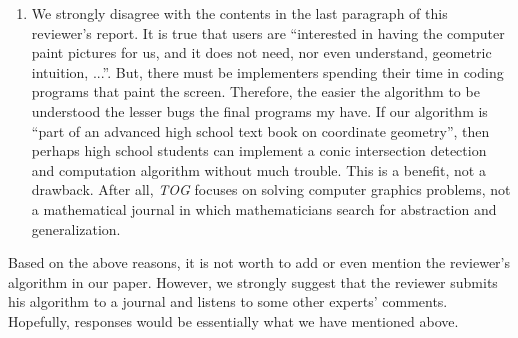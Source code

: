 \begin{enumerate}
     \item We strongly disagree with the contents in the last paragraph of this
          reviewer's report.
          It is true that users are ``interested in having the computer paint
          pictures for us, and it does not need, nor even understand, geometric
          intuition, ...''.  But, there must be implementers spending
          their time in coding programs that paint the screen.
          Therefore, the easier the algorithm to be understood the lesser bugs
          the final programs my have.  If our algorithm is ``part of an
          advanced high school text book on coordinate geometry'', then
          perhaps high school students can implement a conic intersection
          detection and computation algorithm without much trouble.
          This is a benefit, not a drawback.
          After all, {\em TOG} focuses on solving computer graphics problems,
          not a mathematical journal in which mathematicians search for
          abstraction and generalization.

\end{enumerate}

     Based on the above reasons, it is not worth to add or even mention the
reviewer's algorithm in our paper.  However, we strongly suggest that the
reviewer submits his algorithm to a journal and listens to some other experts'
comments.  Hopefully, responses would be essentially what we have mentioned
above.


